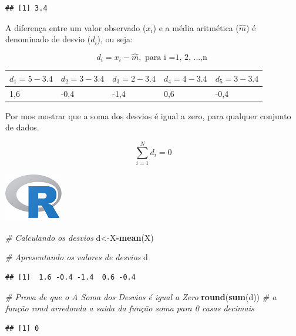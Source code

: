 \documentclass[
]{article}
\newenvironment{Shaded}{\begin{snugshade}}{\end{snugshade}}
\newcommand{\CommentTok}[1]{\textcolor[rgb]{0.56,0.35,0.01}{\textit{#1}}}
\newcommand{\KeywordTok}[1]{\textcolor[rgb]{0.13,0.29,0.53}{\textbf{#1}}}
\newcommand{\NormalTok}[1]{#1}
\newcommand{\OperatorTok}[1]{\textcolor[rgb]{0.81,0.36,0.00}{\textbf{#1}}}
\begin{document}
\begin{verbatim}
## [1] 3.4
\end{verbatim}

A diferença entre um valor observado (\(x_i\)) e a média aritmética
(\(\hat{m}\)) é denominado de desvio (\(d_i\)), ou seja:

\[
 d_i = x_i - \hat{m}, \text{ para  i =1, 2, ...,n  }
\]

\begin{longtable}[]{@{}lllll@{}}
\toprule
\(d_1 = 5-3.4\) & \(d_2=3-3.4\) & \(d_3 = 2-3.4\) & \(d_4 = 4-3.4\) &
\(d_5 = 3-3.4\)\tabularnewline
\midrule
\endhead
1,6 & -0,4 & -1,4 & 0,6 & -0,4\tabularnewline
\bottomrule
\end{longtable}

Por mos mostrar que a soma dos desvios é igual a zero, para qualquer
conjunto de dados.

\[
\sum_{i=1}^{N}d_i = 0
\]

\includegraphics{R.png}

\begin{Shaded}
\begin{Highlighting}[]
\CommentTok{# Calculando os desvios}
\NormalTok{d<-X}\OperatorTok{-}\KeywordTok{mean}\NormalTok{(X)}

\CommentTok{# Apresentando os valores de desvios}
\NormalTok{d}
\end{Highlighting}
\end{Shaded}

\begin{verbatim}
## [1]  1.6 -0.4 -1.4  0.6 -0.4
\end{verbatim}

\begin{Shaded}
\begin{Highlighting}[]
\CommentTok{# Prova de que o A Soma dos Desvios é igual a Zero}
\KeywordTok{round}\NormalTok{(}\KeywordTok{sum}\NormalTok{(d))  }\CommentTok{# a função rond arredonda a saida da função soma para 0 casas decimais}
\end{Highlighting}
\end{Shaded}

\begin{verbatim}
## [1] 0
\end{verbatim}
\end{document}
